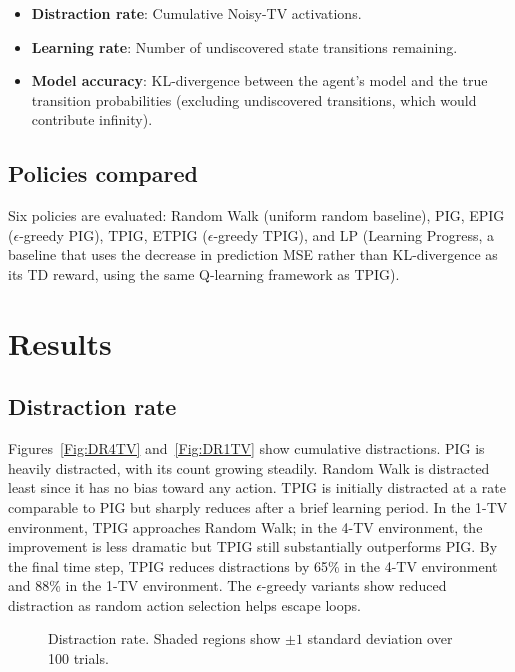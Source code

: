 \documentclass[letterpaper]{article}
\begin{document}
\begin{itemize}
  \item \textbf{Distraction rate}: Cumulative Noisy-TV activations.
  \item \textbf{Learning rate}: Number of undiscovered state
    transitions remaining.
  \item \textbf{Model accuracy}: KL-divergence between the agent's
    model and the true transition probabilities (excluding
    undiscovered transitions, which would contribute infinity).
\end{itemize}

\subsection{Policies compared}

Six policies are evaluated: Random Walk (uniform random baseline),
PIG, EPIG ($\epsilon$-greedy PIG), TPIG, ETPIG ($\epsilon$-greedy
TPIG), and LP (Learning Progress, a baseline that uses the decrease
in prediction MSE rather than KL-divergence as its TD reward, using
the same Q-learning framework as TPIG).

\section{Results}

\subsection{Distraction rate}

Figures~\ref{Fig:DR4TV} and~\ref{Fig:DR1TV} show cumulative
distractions.  PIG is heavily distracted, with its count growing
steadily.  Random Walk is distracted least since it has no bias toward
any action.  TPIG is initially distracted at a rate comparable to PIG
but sharply reduces after a brief learning period.  In the 1-TV
environment, TPIG approaches Random Walk; in the 4-TV environment, the
improvement is less dramatic but TPIG still substantially outperforms
PIG.  By the final time step, TPIG reduces distractions by 65\% in
the 4-TV environment and 88\% in the 1-TV environment.  The
$\epsilon$-greedy variants show reduced distraction as random action
selection helps escape loops.

\newsavebox{\DRfourTV}\newsavebox{\DRoneTV}
\sbox{\DRfourTV}{}
\sbox{\DRoneTV}{}
\begin{figure}
  \centering
  \hfill
  \caption{Distraction rate.  Shaded regions show $\pm 1$ standard deviation over 100 trials.}
  \label{Fig:DR}
\end{figure}
\end{document}
